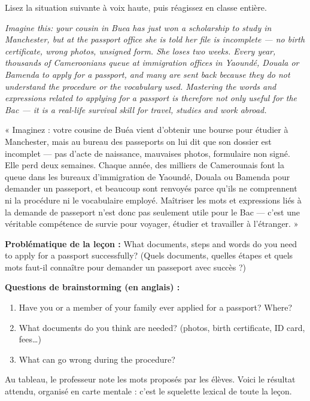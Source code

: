 \documentclass[11pt]{article}
\newcommand{\cle}[1]{{\popxbold\color{popdark}#1}}
\begin{document}
\begin{experience}
Lisez la situation suivante à voix haute, puis réagissez en classe entière.

\emph{Imagine this: your cousin in Buea has just won a scholarship to study in Manchester, but at the passport office she is told her file is incomplete — no birth certificate, wrong photos, unsigned form. She loses two weeks. Every year, thousands of Cameroonians queue at immigration offices in Yaoundé, Douala or Bamenda to apply for a passport, and many are sent back because they do not understand the procedure or the vocabulary used. Mastering the words and expressions related to applying for a passport is therefore not only useful for the Bac — it is a real-life survival skill for travel, studies and work abroad.}

« Imaginez : votre cousine de Buéa vient d'obtenir une bourse pour étudier à Manchester, mais au bureau des passeports on lui dit que son dossier est incomplet — pas d'acte de naissance, mauvaises photos, formulaire non signé. Elle perd deux semaines. Chaque année, des milliers de Camerounais font la queue dans les bureaux d'immigration de Yaoundé, Douala ou Bamenda pour demander un passeport, et beaucoup sont renvoyés parce qu'ils ne comprennent ni la procédure ni le vocabulaire employé. Maîtriser les mots et expressions liés à la demande de passeport n'est donc pas seulement utile pour le Bac — c'est une véritable compétence de survie pour voyager, étudier et travailler à l'étranger. »

\textbf{Problématique de la leçon :} What documents, steps and words do you need to apply for a passport successfully? (Quels documents, quelles étapes et quels mots faut-il connaître pour demander un passeport avec succès ?)

\textbf{Questions de brainstorming (en anglais) :}
\begin{enumerate}
\item Have you or a member of your family ever applied for a passport? Where?
\item What documents do you think are needed? (photos, birth certificate, ID card, fees\ldots)
\item What can go wrong during the procedure?
\end{enumerate}
\end{experience}

Au tableau, le professeur note les mots proposés par les élèves. Voici le résultat attendu, organisé en carte mentale : c'est le \cle{squelette lexical} de toute la leçon.
\end{document}
